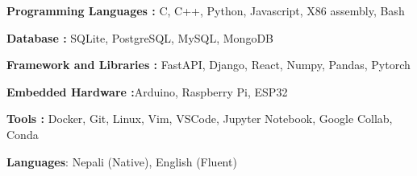 \begin{cventries}

  \cventry
    {} %
    {} %
    {} %
    {} %
    {
     \textbf{Programming Languages :} C, C++, Python, Javascript, X86 assembly, Bash 
    }

\cventry
    {} %
    {} %
    {} %
    {} %
    {
      \textbf{Database :} SQLite, PostgreSQL, MySQL, MongoDB
    }

\cventry
    {} %
    {} %
    {} %
    {} %
    {
      \textbf{Framework and Libraries :} FastAPI, Django, React, Numpy, Pandas, Pytorch
    }

\cventry
    {} %
    {} %
    {} %
    {} %
    {
       \textbf{Embedded Hardware :}Arduino, Raspberry Pi, ESP32
    }

\cventry
    {} %
    {} %
    {} %
    {} %
    {
       \textbf{Tools :} Docker, Git, Linux, Vim, VSCode, Jupyter Notebook, Google Collab, Conda
    }

\cventry
    {} %
    {} %
    {} %
    {} %
    {
\textbf{Languages}: Nepali (Native), English (Fluent)
    }

\end{cventries}